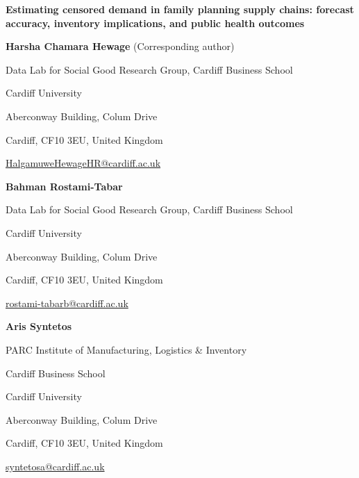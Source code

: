 \documentclass[
  11pt,
  authoryear,
  doubleblind,
  3p]{elsarticle}
\begin{document}
\begingroup
\thispagestyle{plain}
\singlespacing
\setlength{\parindent}{0pt}
\setlength{\parskip}{0pt}
{\centering\Large\bfseries Estimating censored demand in family planning supply chains: forecast accuracy, inventory implications, and public health outcomes\par}
\vspace{1.5em}

\noindent\begin{minipage}{\linewidth}
\textbf{Harsha Chamara Hewage} (Corresponding author)\par
Data Lab for Social Good Research Group, Cardiff Business School\par
Cardiff University\par
Aberconway Building, Colum Drive\par
Cardiff, CF10 3EU, United Kingdom\par
\href{mailto:HalgamuweHewageHR@cardiff.ac.uk}{HalgamuweHewageHR@cardiff.ac.uk}\par
\end{minipage}\par\vspace{1em}

\noindent\begin{minipage}{\linewidth}
\textbf{Bahman Rostami-Tabar}\par
Data Lab for Social Good Research Group, Cardiff Business School\par
Cardiff University\par
Aberconway Building, Colum Drive\par
Cardiff, CF10 3EU, United Kingdom\par
\href{mailto:rostami-tabarb@cardiff.ac.uk}{rostami-tabarb@cardiff.ac.uk}\par
\end{minipage}\par\vspace{1em}

\noindent\begin{minipage}{\linewidth}
\textbf{Aris Syntetos}\par
PARC Institute of Manufacturing, Logistics \& Inventory\par
Cardiff Business School\par
Cardiff University\par
Aberconway Building, Colum Drive\par
Cardiff, CF10 3EU, United Kingdom\par
\href{mailto:syntetosa@cardiff.ac.uk}{syntetosa@cardiff.ac.uk}\par
\end{minipage}\par\vspace{1em}
\end{document}
